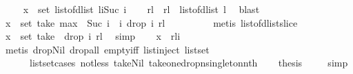 \begin{isabellebody}
%
\isadelimproof
%
\endisadelimproof
%
\isatagproof
{}\isamarkupfalse%
{\isacharminus}\isanewline
\ \ \isamarkupfalse%
\ {}{\isacharcolon}\ {\isachardoublequoteopen}x\ {\isasymin}\ set\ {\isacharparenleft}list{\isacharunderscore}of{\isacharunderscore}dlist\ {\isacharparenleft}l{\isasymdagger}i{\isachardot}{\isachardot}{\isacharparenleft}Suc\ i{\isacharparenright}{\isacharparenright}{\isacharparenright}{\isachardoublequoteclose}\isanewline
\ \ \isamarkupfalse%
\ rl\ \ {}{\isacharcolon}{\isachardoublequoteopen}rl\ {\isacharequal}\ list{\isacharunderscore}of{\isacharunderscore}dlist\ l{\isachardoublequoteclose}\ \isamarkupfalse%
\ blast\isanewline
\ \ \isamarkupfalse%
\ {\isachardoublequoteopen}x\ {\isasymin}\ set\ {\isacharparenleft}take\ {\isacharparenleft}max\ {}\ {\isacharparenleft}Suc\ i\ {\isacharminus}\ i{\isacharparenright}{\isacharparenright}\ {\isacharparenleft}drop\ i\ rl{\isacharparenright}{\isacharparenright}{\isachardoublequoteclose}\ \isanewline
\ \ \ \ \isamarkupfalse%
\ {}\ \isamarkupfalse%
\ {\isacharparenleft}metis\ list{\isacharunderscore}of{\isacharunderscore}dlist{\isacharunderscore}slice\ {\isacharparenright}\isanewline
\ \ \isamarkupfalse%
\ {\isachardoublequoteopen}x\ {\isasymin}\ set\ {\isacharparenleft}take\ {}\ {\isacharparenleft}drop\ i\ rl{\isacharparenright}{\isacharparenright}{\isachardoublequoteclose}\ \isamarkupfalse%
\ simp\isanewline
\ \ \isamarkupfalse%
\ {\isachardoublequoteopen}x\ {\isacharequal}\ rl{\isacharbang}i{\isachardoublequoteclose}\ \isanewline
\ \ \ \ \isamarkupfalse%
\ {\isacharparenleft}metis\ drop{\isacharunderscore}Nil\ drop{\isacharunderscore}all\ empty{\isacharunderscore}iff\ list{\isachardot}inject\ list{\isachardot}set{\isacharparenleft}{}{\isacharparenright}\ \isanewline
\ \ \ \ \ \ list{\isachardot}set{\isacharunderscore}cases\ not{\isacharunderscore}less\ take{\isacharunderscore}Nil\ take{\isacharunderscore}one{\isacharunderscore}drop{\isacharunderscore}n{\isacharunderscore}singleton{\isacharunderscore}nth{\isacharparenright}\isanewline
\ \ \isamarkupfalse%
\ {\isacharquery}thesis\ \isamarkupfalse%
\ {}\ \isamarkupfalse%
\ simp\isanewline
{}\isamarkupfalse%
%
\endisatagproof
{\isafoldproof}%
%
\isadelimproof
\isanewline
%
\endisadelimproof
\isanewline
{}\isamarkupfalse%

\end{isabellebody}
